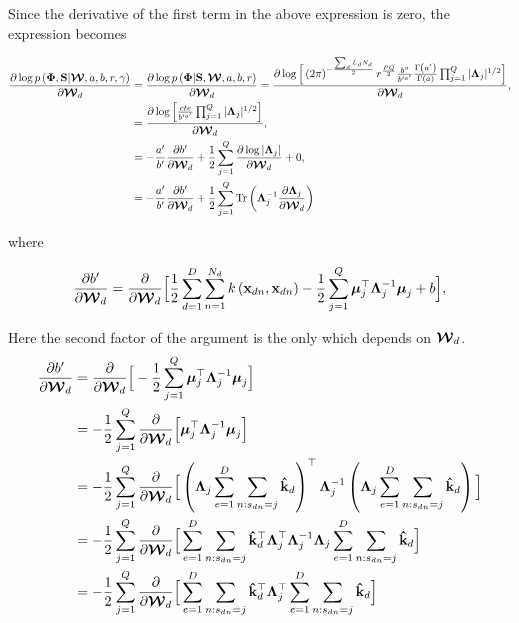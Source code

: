 	Since the derivative of the first term in the above expression is zero, the expression becomes
	
	\begin{align}
	\frac{\partial \log p\left(\boldsymbol{\Phi},\mathbf{S}|\boldsymbol{\mathcal{W}},a,b,r,\gamma\right)}{\partial\boldsymbol{\mathcal{W}}_d} &=
	\frac{\partial \log p\left(\boldsymbol{\Phi}|\mathbf{S},\boldsymbol{\mathcal{W}},a,b,r\right)}{\partial\boldsymbol{\mathcal{W}}_d} = \frac{\partial \log \Big[\left(2\pi\right)^{-\frac{\sum_d L_d N_d}{2}}r^{\frac{PQ}{2}}\frac{b^{a}}{b'^{a'}}\frac{\Gamma\left(a'\right)}{\Gamma\left(a\right)}\prod_{j=1}^{Q}|\boldsymbol{\Lambda}_j|^{1/2}\Big]}{\partial\boldsymbol{\mathcal{W}}_d},\notag\\
	&= \frac{\partial \log \Big[\frac{cte}{b'^{a'}} \prod_{j=1}^{Q}|\boldsymbol{\Lambda}_j|^{1/2}\Big]}{\partial\boldsymbol{\mathcal{W}}_d}\notag,\\
	& = -\frac{a'}{b'}\frac{\partial b'}{\partial\boldsymbol{\mathcal{W}}_d}+\frac{1}{2}\sum_{j=1}^{Q}\frac{\partial \log |\boldsymbol{\Lambda}_j|}{\partial\boldsymbol{\mathcal{W}}_d}+0 , \notag \\
	& =  -\frac{a'}{b'}\frac{\partial b'}{\partial\boldsymbol{\mathcal{W}}_d}+\frac{1}{2}\sum_{j=1}^{Q} \operatorname{Tr}\left(\boldsymbol{\Lambda}_j^{-1}\frac{\partial \boldsymbol{\Lambda}_j}{\partial\boldsymbol{\mathcal{W}}_d}\right)
	\label{eq:derivativeW1}
	\end{align}
	
	where
	
	\begin{align}
	\frac{\partial b'}{\partial\boldsymbol{\mathcal{W}}_d} = \frac{\partial}{\partial\boldsymbol{\mathcal{W}}_d}\Big[ \frac{1}{2} \sum_{d=1}^{D}\sum_{n=1}^{N_d}k\left(\mathbf{x}_{dn},\mathbf{x}_{dn}\right) -\frac{1}{2}\sum_{j=1}^{Q}\boldsymbol{\mu}_j^\top\boldsymbol{\Lambda}_j^{-1}\boldsymbol{\mu}_j +b \Big],
	\end{align}
	
	Here the second factor of the argument is the only which depends on $\boldsymbol{\mathcal{W}}_d$.
	\begin{align}
	\frac{\partial b'}{\partial\boldsymbol{\mathcal{W}}_d} &= \frac{\partial}{\partial\boldsymbol{\mathcal{W}}_d}\Big[-\frac{1}{2}\sum_{j=1}^{Q}\boldsymbol{\mu}_j^\top\boldsymbol{\Lambda}_j^{-1}\boldsymbol{\mu}_j \Big] \notag \\
	&=-\frac{1}{2}\sum_{j=1}^{Q}\frac{\partial}{\partial\boldsymbol{\mathcal{W}}_d}\Big[\boldsymbol{\mu}_j^\top\boldsymbol{\Lambda}_j^{-1}\boldsymbol{\mu}_j \Big] \notag \\
	&= -\frac{1}{2}\sum_{j=1}^{Q}\frac{\partial}{\partial\boldsymbol{\mathcal{W}}_d}\Big[\left(\boldsymbol{\Lambda}_j\sum\limits_{e=1}^{D}{\sum\limits_{n:s_{dn}=j}\mathbf{\hat{k}}_d}\right)^\top\boldsymbol{\Lambda}_j^{-1}\left(\boldsymbol{\Lambda}_j\sum\limits_{e=1}^{D}{\sum\limits_{n:s_{dn}=j}\mathbf{\hat{k}}_d}\right) \Big] \notag \\
	&= -\frac{1}{2}\sum_{j=1}^{Q}\frac{\partial}{\partial\boldsymbol{\mathcal{W}}_d}\Big[\sum\limits_{e=1}^{D}{\sum\limits_{n:s_{dn}=j}\mathbf{\hat{k}}_d^\top} \boldsymbol{\Lambda}_j^\top \boldsymbol{\Lambda}_j^{-1}\boldsymbol{\Lambda}_j\sum\limits_{e=1}^{D}{\sum\limits_{n:s_{dn}=j}\mathbf{\hat{k}}_d}\Big] \notag \\
	&= -\frac{1}{2}\sum_{j=1}^{Q}\frac{\partial}{\partial\boldsymbol{\mathcal{W}}_d}\Big[\sum\limits_{e=1}^{D}{\sum\limits_{n:s_{dn}=j}\mathbf{\hat{k}}_d^\top} \boldsymbol{\Lambda}_j^\top \sum\limits_{e=1}^{D}{\sum\limits_{n:s_{dn}=j}\mathbf{\hat{k}}_d}\Big]
	\end{align}
	

